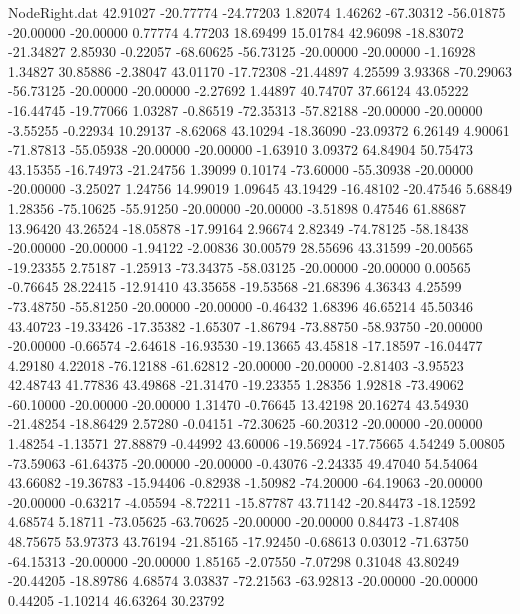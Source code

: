 \begin{filecontents}{NodeRight.dat}
  42.91027  -20.77774  -24.77203     1.82074    1.46262  -67.30312  -56.01875  -20.00000  -20.00000    0.77774    4.77203   18.69499   15.01784
  42.96098  -18.83072  -21.34827     2.85930   -0.22057  -68.60625  -56.73125  -20.00000  -20.00000   -1.16928    1.34827   30.85886   -2.38047
  43.01170  -17.72308  -21.44897     4.25599    3.93368  -70.29063  -56.73125  -20.00000  -20.00000   -2.27692    1.44897   40.74707   37.66124
  43.05222  -16.44745  -19.77066     1.03287   -0.86519  -72.35313  -57.82188  -20.00000  -20.00000   -3.55255   -0.22934   10.29137   -8.62068
  43.10294  -18.36090  -23.09372     6.26149    4.90061  -71.87813  -55.05938  -20.00000  -20.00000   -1.63910    3.09372   64.84904   50.75473
  43.15355  -16.74973  -21.24756     1.39099    0.10174  -73.60000  -55.30938  -20.00000  -20.00000   -3.25027    1.24756   14.99019    1.09645
  43.19429  -16.48102  -20.47546     5.68849    1.28356  -75.10625  -55.91250  -20.00000  -20.00000   -3.51898    0.47546   61.88687   13.96420
  43.26524  -18.05878  -17.99164     2.96674    2.82349  -74.78125  -58.18438  -20.00000  -20.00000   -1.94122   -2.00836   30.00579   28.55696
  43.31599  -20.00565  -19.23355     2.75187   -1.25913  -73.34375  -58.03125  -20.00000  -20.00000    0.00565   -0.76645   28.22415  -12.91410
  43.35658  -19.53568  -21.68396     4.36343    4.25599  -73.48750  -55.81250  -20.00000  -20.00000   -0.46432    1.68396   46.65214   45.50346
  43.40723  -19.33426  -17.35382    -1.65307   -1.86794  -73.88750  -58.93750  -20.00000  -20.00000   -0.66574   -2.64618  -16.93530  -19.13665
  43.45818  -17.18597  -16.04477     4.29180    4.22018  -76.12188  -61.62812  -20.00000  -20.00000   -2.81403   -3.95523   42.48743   41.77836
  43.49868  -21.31470  -19.23355     1.28356    1.92818  -73.49062  -60.10000  -20.00000  -20.00000    1.31470   -0.76645   13.42198   20.16274
  43.54930  -21.48254  -18.86429     2.57280   -0.04151  -72.30625  -60.20312  -20.00000  -20.00000    1.48254   -1.13571   27.88879   -0.44992
  43.60006  -19.56924  -17.75665     4.54249    5.00805  -73.59063  -61.64375  -20.00000  -20.00000   -0.43076   -2.24335   49.47040   54.54064
  43.66082  -19.36783  -15.94406    -0.82938   -1.50982  -74.20000  -64.19063  -20.00000  -20.00000   -0.63217   -4.05594   -8.72211  -15.87787
  43.71142  -20.84473  -18.12592     4.68574    5.18711  -73.05625  -63.70625  -20.00000  -20.00000    0.84473   -1.87408   48.75675   53.97373
  43.76194  -21.85165  -17.92450    -0.68613    0.03012  -71.63750  -64.15313  -20.00000  -20.00000    1.85165   -2.07550   -7.07298    0.31048
  43.80249  -20.44205  -18.89786     4.68574    3.03837  -72.21563  -63.92813  -20.00000  -20.00000    0.44205   -1.10214   46.63264   30.23792

\end{filecontents}
